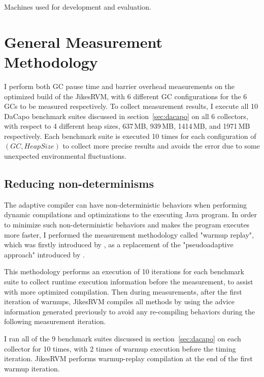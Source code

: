 \begin{table*}
  \centering
  
  \caption{Machines used for development and evaluation.}
  \label{tab:machines}
\end{table*}

\section{General Measurement Methodology}
\label{sec:generalmethod}

I perform both GC pause time and barrier overhead measurements on the optimized build
of the JikesRVM, with 6 different GC configurations for the 6 GCs to be measured respectively.
To collect measurement results, I execute all 10 DaCapo benchmark suites discussed in section~\ref{sec:dacapo}
on all 6 collectors, with respect to 4 different heap sizes, 637\,MB, 939\,MB, 1414\,MB, and 1971\,MB
respectively. Each benchmark suite is executed 10 times for each configuration of $(GC, HeapSize)$ to
collect more precise results and avoids the error due to some unexpected environmental fluctuations.

\subsection{Reducing non-determinisms}
\label{subsec:nondeterminisms}

The adaptive compiler can have non-deterministic behaviors when performing dynamic
compilations and optimizations to the executing Java program. In order to minimize
such non-deterministic behaviors and makes the program executes more faster, I performed
the measurement methodology called "warmup replay", which was firstly introduced by
\cite{yang2012barriers}, as a replacement of the "pseudoadaptive approach" introduced by \cite{blackburn2004barriers}.

This methodology performs an execution of 10 iterations for each benchmark suite to
collect runtime execution information before the measurement, to assist with more optimized compilation.
Then during measurements, after the first iteration of warmups, JikesRVM compiles all
methods by using the advice information generated previously to avoid any re-compiling
behaviors during the following measurement iteration.

I ran all of the 9 benchmark suites discussed in section~\ref{sec:dacapo} on each collector
for 10 times, with 2 times of warmup execution before the timing iteration.
JikesRVM performs warmup-replay compilation at the end of the first warmup iteration.

